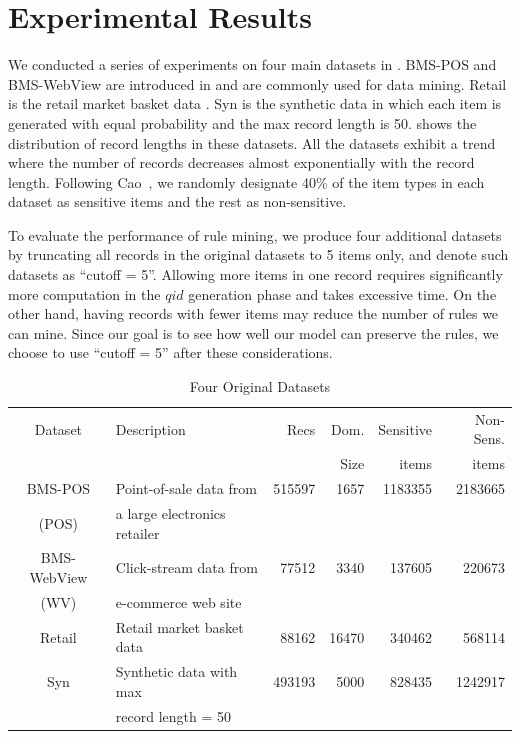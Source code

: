 \section{Experimental Results}
\label{sec:eval}


We conducted a series of experiments on
four main datasets in . BMS-POS and BMS-WebView are
introduced in \cite{Zheng:2001:RWP:502512.502572} and are commonly used for
data mining. Retail is the retail market basket data \cite{brijs99:retailData}. Syn is the synthetic data in which each item is generated with
equal probability and the max record length is 50.
 shows the distribution of record lengths in these datasets.
All the datasets exhibit a trend where the number of records decreases 
almost exponentially with the record length.
Following Cao~\cite{Cao:2010:rho}, we randomly designate 
40\% of the item types in each dataset as sensitive items and 
the rest as non-sensitive.

To evaluate the performance of rule mining,
we produce four additional datasets by truncating all records in the
original datasets to 5 items only, and denote
such datasets as ``cutoff = 5''.
Allowing more items in one record requires significantly more computation in the $qid$
generation phase and takes excessive time. On the other hand,
having records with fewer items may reduce the number of rules we can mine.
Since our goal is to see how well our model can preserve the rules,
we choose to use ``cutoff = 5'' after these considerations.

\begin{table}[tb]
\centering
\caption{Four Original Datasets\label{tab:datasets}}{
\begin{tabular}{|c|l|r|r|r|r|} \hline
Dataset	& Description & Recs & Dom. & Sensitive & Non-Sens.\\
& & & Size & items & items  \\ \hline \hline
BMS-POS &Point-of-sale data from &515597 & 1657&1183355 &  2183665\\
(POS)	& a large electronics retailer   &	&	&	& \\ \hline
BMS-WebView &Click-stream data from &77512 & 3340& 137605 & 220673  \\
(WV) & e-commerce web site  & &  & & \\ \hline
Retail &  Retail market basket data   & 88162&16470 &340462 & 568114  \\ \hline
Syn & Synthetic data with max & 493193 &5000 &828435 & 1242917 \\
 & record length = 50   & & & & \\ \hline
\end{tabular}
}
\end{table}

